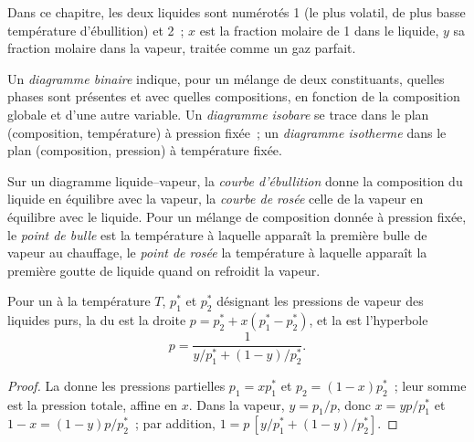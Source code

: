 Dans ce chapitre, les deux liquides sont numérotés 1 (le plus volatil, de plus basse
température d'ébullition) et 2~; $x$ est la fraction molaire de 1 dans le liquide, $y$ sa
fraction molaire dans la vapeur, traitée comme un gaz parfait.

\begin{definition}\label{def:b2:liquid-vapour-diagrams:binary-diagram}
Un \emph{diagramme binaire} indique, pour un mélange de deux
constituants, quelles phases sont présentes et avec quelles compositions, en
fonction de la composition globale et d'une autre variable. Un
\emph{diagramme isobare} se trace dans le plan
(composition, température) à pression fixée~; un \emph{diagramme
isotherme} dans le plan (composition, pression) à
température fixée.
\end{definition}

\begin{definition}\label{def:b2:liquid-vapour-diagrams:bubble-dew}
Sur un diagramme liquide--vapeur, la \emph{courbe d'ébullition} donne
la composition du liquide en équilibre avec la vapeur, la \emph{courbe de
rosée} celle de la vapeur en équilibre avec le liquide. Pour un
mélange de composition donnée à pression fixée, le \emph{point de
bulle} est la température à laquelle apparaît la première bulle de
vapeur au chauffage, le \emph{point de rosée} la
température à laquelle apparaît la première goutte de liquide quand on refroidit la vapeur.
\end{definition}

\begin{proposition}\label{prop:b2:liquid-vapour-diagrams:ideal-curves}
Pour un  à la température $T$, $p_1^*$ et $p_2^*$ désignant les pressions
de vapeur des liquides purs, la  du  est
la droite $p = p_2^* + x(p_1^* - p_2^*)$, et la  est
l'hyperbole
\[
  p = \frac{1}{y/p_1^* + (1 - y)/p_2^*} .
\]
\end{proposition}

\begin{proof}
La  donne les pressions partielles $p_1 = xp_1^*$ et $p_2 = (1 -
x)p_2^*$~; leur somme est la pression totale, affine en $x$. Dans la vapeur,
$y = p_1/p$, donc $x = yp/p_1^*$ et $1 - x = (1 - y)p/p_2^*$~; par addition,
$1 = p\,[y/p_1^* + (1 - y)/p_2^*]$.
\end{proof}

